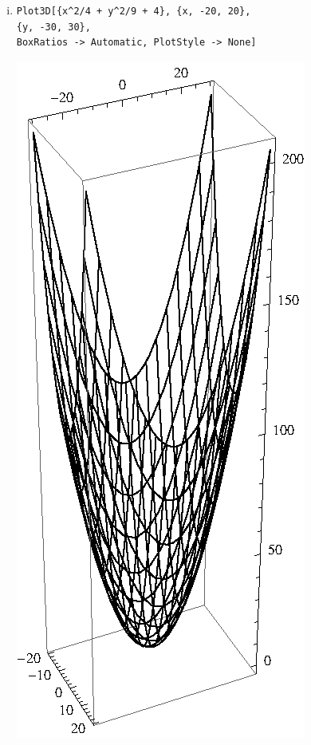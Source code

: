 \documentclass[10pt,a4paper]{scrartcl}
\begin{document}
\begin{enumerate}[(i)]
\begin{minipage}{0.49\columnwidth}
\begin{center}
\end{center}
\end{minipage}
\item 
\begin{minipage}{0.50\columnwidth}
\begin{lstlisting}[caption= Mathematica Code für den Graph von h]
Plot3D[{x^2/4 + y^2/9 + 4}, {x, -20, 20}, 
{y, -30, 30}, 
BoxRatios -> Automatic, PlotStyle -> None]
\end{lstlisting}
\end{minipage}
\begin{minipage}{0.50\columnwidth}
\begin{center}
\includegraphics[scale=0.7]{1ii.eps} 

\end{center}
\end{minipage}
\end{enumerate}
\end{document}
